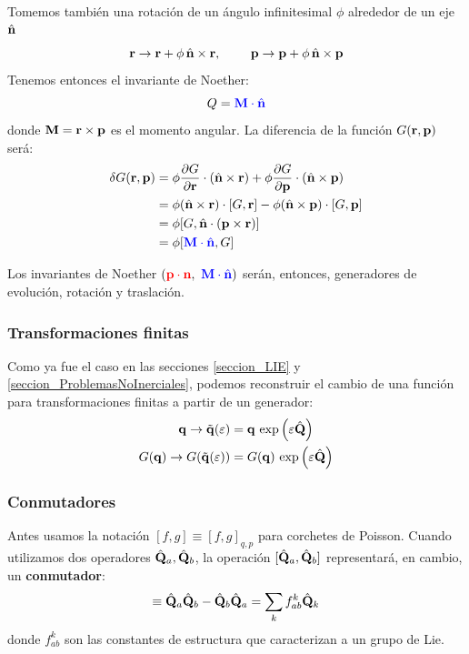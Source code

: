 \documentclass[]{article}
\numberwithin{equation}{section}
\begin{document}
Tomemos también una rotación de un ángulo infinitesimal \(\phi\) alrededor de un eje \(\hat{\mathbf{n}}\)
\begin{equation*}
	\mathbf{r} \rightarrow \mathbf{r} + \phi \, \hat{\mathbf{n}}\times\mathbf{r}, ~~~~~~~ \mathbf{p} \rightarrow \mathbf{p} + \phi \, \hat{\mathbf{n}}\times\mathbf{p}
\end{equation*}
Tenemos entonces el invariante de Noether:
\begin{equation*}
	Q = \textcolor{blue}{\mathbf{M}\cdot\hat{\mathbf{n}}}
\end{equation*}
donde \(\mathbf{M} = \mathbf{r}\times\mathbf{p}\) es el momento angular. La diferencia de la función \(G(\mathbf{r},\mathbf{p})\) será:
\begin{align*}
	\delta G(\mathbf{r},\mathbf{p}) &= \phi \dfrac{\partial G}{\partial \mathbf{r}}\cdot(\hat{\mathbf{n}}\times\mathbf{r}) + \phi \dfrac{\partial G}{\partial \mathbf{p}}\cdot(\hat{\mathbf{n}}\times\mathbf{p})\\
	&= \phi (\hat{\mathbf{n}}\times\mathbf{r})\cdot[G,\mathbf{r}] - \phi (\hat{\mathbf{n}}\times\mathbf{p})\cdot[G,\mathbf{p}]\\
	&= \phi [G, \hat{\mathbf{n}}\cdot(\mathbf{p}\times\mathbf{r})]\\
	&= \phi [\textcolor{blue}{\mathbf{M}\cdot\hat{\mathbf{n}}}, G]
\end{align*}

Los invariantes de Noether \(\left(\textcolor{red}{\mathbf{p}\cdot\mathbf{n}}, ~ \textcolor{blue}{\mathbf{M}\cdot\hat{\mathbf{n}}}\right)\) serán, entonces, generadores de evolución, rotación y traslación.

\subsubsection{Transformaciones finitas}
Como ya fue el caso en las secciones \ref{seccion_LIE} y \ref{seccion_ProblemasNoInerciales}, podemos reconstruir el cambio de una función para transformaciones finitas a partir de un generador:
\begin{align}
	\mathbf{q} \rightarrow \tilde{\mathbf{q}}(\varepsilon) &= \mathbf{q} \, \exp\left(\varepsilon\hat{\mathbf{Q}}\right)\\
	G(\mathbf{q}) \rightarrow G(\tilde{\mathbf{q}}(\varepsilon)) &= G(\mathbf{q}) \, \exp\left(\varepsilon\hat{\mathbf{Q}}\right)
\end{align}

\subsubsection{Conmutadores} 
Antes usamos la notación \([f,g] \equiv [f,g]_{q,p}\) para corchetes de Poisson. Cuando utilizamos dos operadores \(\hat{\mathbf{Q}}_{a}, \hat{\mathbf{Q}}_{b}\), la operación \([\hat{\mathbf{Q}}_{a}, \hat{\mathbf{Q}}_{b}]\) representará, en cambio, un \textbf{conmutador}:
\begin{equation}
	[\hat{\n{Q}}_{a}, \hat{\n{Q}}_{b}] \equiv \hat{\n{Q}}_{a} \hat{\n{Q}}_{b} - \hat{\n{Q}}_{b} \hat{\n{Q}}_{a} = \sum_{k} f_{ab}^{k} \hat{\n{Q}}_k
\end{equation}
donde \(f_{ab}^{k}\) son las constantes de estructura que caracterizan a un grupo de Lie.
\end{document}
